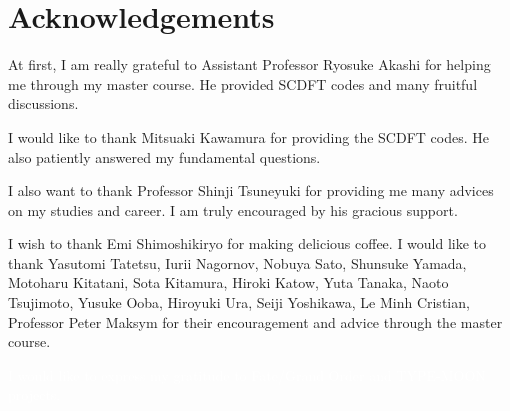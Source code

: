 

\chapter*{Acknowledgements}
At first, I am really grateful to Assistant Professor Ryosuke Akashi for helping me through my 
master course. He provided SCDFT codes and many fruitful discussions.

I would like to thank Mitsuaki Kawamura for providing the SCDFT codes. He also patiently answered
my fundamental questions.

I also want to thank Professor Shinji Tsuneyuki for providing me many advices on my studies and
career. I am truly encouraged by his gracious support.

I wish to thank Emi Shimoshikiryo for making delicious coffee.
I would like to thank Yasutomi Tatetsu, Iurii Nagornov, Nobuya Sato, Shunsuke Yamada, 
Motoharu Kitatani, Sota Kitamura, Hiroki Katow, Yuta Tanaka, Naoto Tsujimoto, Yusuke Ooba, 
Hiroyuki Ura, Seiji Yoshikawa, Le Minh Cristian, Professor Peter Maksym for their encouragement
and advice through the master course.

\textcolor{white}{
 I would like to express my gratitude to Fate/Grand Order and TYPE-MOON projects.
}

\clearpage

